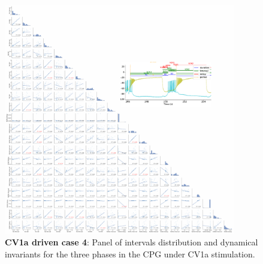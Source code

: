 \begin{figure}[htbp]
	\centering
	\includegraphics[width=0.9\textwidth]{./invariants/data/SUSSEX/CV1a_driven4/images/3phases/panel_with_pairplot.pdf}
	\caption{\textbf{CV1a driven case 4}: Panel of intervals distribution and dynamical invariants for the three phases in the CPG under CV1a stimulation.}
	\label{fig:cv1a 4 3phases pairplot}
\end{figure}

